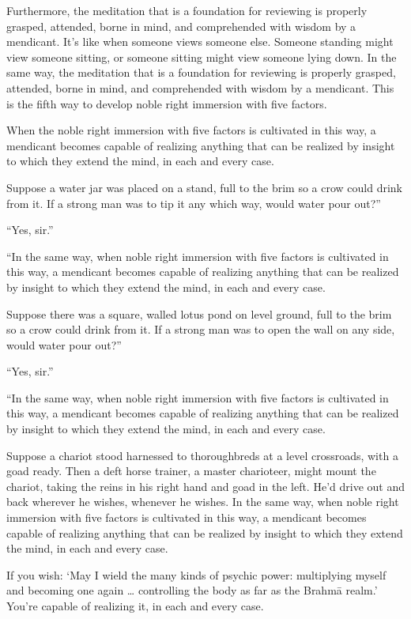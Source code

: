 \documentclass[12pt,openany]{book}%
\begin{document}
Furthermore, the meditation that is a foundation for reviewing is properly grasped, attended, borne in mind, and comprehended with wisdom by a mendicant. It’s like when someone views someone else. Someone standing might view someone sitting, or someone sitting might view someone lying down. In the same way, the meditation that is a foundation for reviewing is properly grasped, attended, borne in mind, and comprehended with wisdom by a mendicant. This is the fifth way to develop noble right immersion with five factors. 

When the noble right immersion with five factors is cultivated in this way, a mendicant becomes capable of realizing anything that can be realized by insight to which they extend the mind, in each and every case. 

Suppose a water jar was placed on a stand, full to the brim so a crow could drink from it. If a strong man was to tip it any which way, would water pour out?” 

“Yes, sir.” 

“In the same way, when noble right immersion with five factors is cultivated in this way, a mendicant becomes capable of realizing anything that can be realized by insight to which they extend the mind, in each and every case. 

Suppose there was a square, walled lotus pond on level ground, full to the brim so a crow could drink from it. If a strong man was to open the wall on any side, would water pour out?” 

“Yes, sir.” 

“In the same way, when noble right immersion with five factors is cultivated in this way, a mendicant becomes capable of realizing anything that can be realized by insight to which they extend the mind, in each and every case. 

Suppose a chariot stood harnessed to thoroughbreds at a level crossroads, with a goad ready. Then a deft horse trainer, a master charioteer, might mount the chariot, taking the reins in his right hand and goad in the left. He’d drive out and back wherever he wishes, whenever he wishes. In the same way, when noble right immersion with five factors is cultivated in this way, a mendicant becomes capable of realizing anything that can be realized by insight to which they extend the mind, in each and every case. 

If you wish: ‘May I wield the many kinds of psychic power: multiplying myself and becoming one again … controlling the body as far as the \textsanskrit{Brahmā} realm.’ You’re capable of realizing it, in each and every case. 
\end{document}
